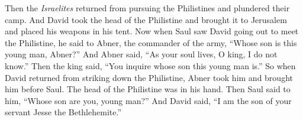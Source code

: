 \begin{biblechapter}
\verse Then the \textit{Israelites} returned from pursuing the Philistines and plundered their camp.
\verse And David took the head of the Philistine and brought it to Jerusalem and placed his weapons in his tent.
\verse Now when Saul saw David going out to meet the Philistine, he said to Abner, the commander of the army, “Whose son is this young man, Abner?” And Abner said, “As your soul lives, O king, I do not know.”
\verse Then the king said, “You inquire whose son this young man is.”
\verse So when David returned from striking down the Philistine, Abner took him and brought him before Saul. The head of the Philistine was in his hand.
\verse Then Saul said to him, “Whose son are you, young man?” And David said, “I am the son of your servant Jesse the Bethlehemite.”
\end{biblechapter}

